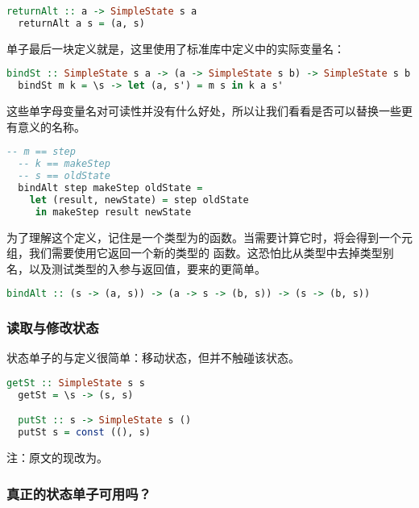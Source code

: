 \documentclass[./main.tex]{subfiles}
\begin{document}
\begin{lstlisting}[language=Haskell]
  returnAlt :: a -> SimpleState s a
  returnAlt a s = (a, s)
\end{lstlisting}

单子最后一块定义就是\acode{(>>=)}，这里使用了标准库中定义中的实际变量名：

\begin{lstlisting}[language=Haskell]
  bindSt :: SimpleState s a -> (a -> SimpleState s b) -> SimpleState s b
  bindSt m k = \s -> let (a, s') = m s in k a s'
\end{lstlisting}

这些单字母变量名对可读性并没有什么好处，所以让我们看看是否可以替换一些更有意义的名称。

\begin{lstlisting}[language=Haskell]
  -- m == step
  -- k == makeStep
  -- s == oldState
  bindAlt step makeStep oldState =
    let (result, newState) = step oldState
     in makeStep result newState
\end{lstlisting}

为了理解这个定义，记住是一个类型为的函数。当需要计算它时，将会得到一个元组，我们需要使用它返回一个新的类型的
函数。这恐怕比从类型中去掉类型别名，以及测试类型的入参与返回值，要来的更简单。

\begin{lstlisting}[language=Haskell]
  bindAlt :: (s -> (a, s)) -> (a -> s -> (b, s)) -> (s -> (b, s))
\end{lstlisting}

\subsubsection*{读取与修改状态}

状态单子的\acode{(>>=)}与定义很简单：移动状态，但并不触碰该状态。

\begin{lstlisting}[language=Haskell]
  getSt :: SimpleState s s
  getSt = \s -> (s, s)

  putSt :: s -> SimpleState s ()
  putSt s = const ((), s)
\end{lstlisting}

注：原文的现改为。

\subsubsection*{真正的状态单子可用吗？}
\end{document}
